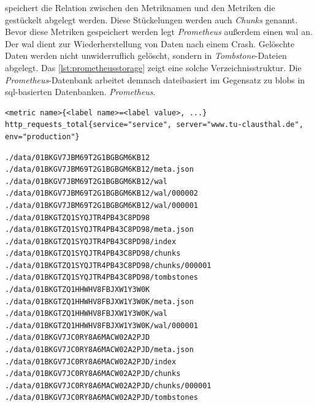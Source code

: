 \documentclass[titlepage]{report}
\begin{document}
speichert die Relation zwischen den Metriknamen und den Metriken die
gestückelt abgelegt werden. Diese Stückelungen werden auch \emph{Chunks}
genannt\cite{PROMETHEUS_STORAGE}. Bevor diese Metriken gespeichert
werden legt \emph{Prometheus} außerdem einen \gls{wal} an. Der \gls{wal}
dient zur Wiederherstellung von Daten nach einem Crash. Gelöschte Daten
werden nicht unwiderruflich gelöscht, sondern in
\emph{Tombstone}\hyp{}Dateien abgelegt. Das
\autoref{lst:prometheusstorage} zeigt eine
solche Verzeichnisstruktur. Die \emph{Prometheus}\hyp{}Datenbank
arbeitet demnach dateibasiert im Gegensatz zu \glspl{blob} in
\gls{sql}\hyp{}basierten Datenbanken.
\emph{Prometheus}.
\begin{minipage}{\linewidth}
\begin{lstlisting}[caption={Prometheus Datenformat und
Beispiel},label={lst:prometheusdataformat}]
<metric name>{<label name>=<label value>, ...}
http_requests_total{service="service", server="www.tu-clausthal.de", env="production"}
\end{lstlisting}
\end{minipage}
\begin{minipage}{\linewidth}
\begin{lstlisting}[caption={Beispiel für das Prometheus Datenmodell},label={lst:prometheusstorage}]
./data/01BKGV7JBM69T2G1BGBGM6KB12
./data/01BKGV7JBM69T2G1BGBGM6KB12/meta.json
./data/01BKGV7JBM69T2G1BGBGM6KB12/wal
./data/01BKGV7JBM69T2G1BGBGM6KB12/wal/000002
./data/01BKGV7JBM69T2G1BGBGM6KB12/wal/000001
./data/01BKGTZQ1SYQJTR4PB43C8PD98
./data/01BKGTZQ1SYQJTR4PB43C8PD98/meta.json
./data/01BKGTZQ1SYQJTR4PB43C8PD98/index
./data/01BKGTZQ1SYQJTR4PB43C8PD98/chunks
./data/01BKGTZQ1SYQJTR4PB43C8PD98/chunks/000001
./data/01BKGTZQ1SYQJTR4PB43C8PD98/tombstones
./data/01BKGTZQ1HHWHV8FBJXW1Y3W0K
./data/01BKGTZQ1HHWHV8FBJXW1Y3W0K/meta.json
./data/01BKGTZQ1HHWHV8FBJXW1Y3W0K/wal
./data/01BKGTZQ1HHWHV8FBJXW1Y3W0K/wal/000001
./data/01BKGV7JC0RY8A6MACW02A2PJD
./data/01BKGV7JC0RY8A6MACW02A2PJD/meta.json
./data/01BKGV7JC0RY8A6MACW02A2PJD/index
./data/01BKGV7JC0RY8A6MACW02A2PJD/chunks
./data/01BKGV7JC0RY8A6MACW02A2PJD/chunks/000001
./data/01BKGV7JC0RY8A6MACW02A2PJD/tombstones
\end{lstlisting}
\end{minipage}
\end{document}
